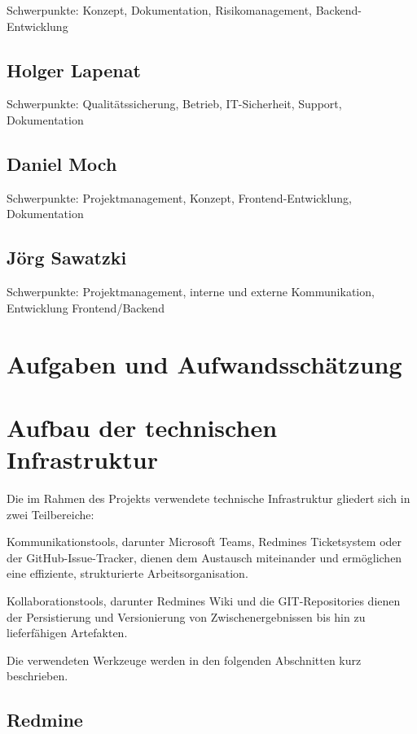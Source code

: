 \documentclass[a4paper,11pt,listof=numbered,glossary=totoc,parskip=half]{scrreprt}
\begin{document}
Schwerpunkte: Konzept, Dokumentation, Risikomanagement, Backend-Entwicklung

\subsection{Holger Lapenat}

Schwerpunkte: Qualitätssicherung, Betrieb, IT-Sicherheit, Support, Dokumentation

\subsection{Daniel Moch}

Schwerpunkte: Projektmanagement, Konzept, Frontend-Entwicklung, Dokumentation

\subsection{Jörg Sawatzki}

Schwerpunkte: Projektmanagement, interne und externe Kommunikation, Entwicklung Frontend/Backend


	
	\newpage
	\section{Aufgaben und Aufwandsschätzung}
	
	\newpage
	\section{Aufbau der technischen Infrastruktur}

Die im Rahmen des Projekts verwendete technische Infrastruktur gliedert sich in zwei Teilbereiche:

Kommunikationstools, darunter Microsoft Teams, Redmines Ticketsystem oder der GitHub-Issue-Tracker, dienen dem Austausch miteinander und ermöglichen eine effiziente, strukturierte Arbeitsorganisation.

Kollaborationstools, darunter Redmines Wiki und die GIT-Repositories dienen der Persistierung und Versionierung von Zwischenergebnissen bis hin zu lieferfähigen Artefakten.

Die verwendeten Werkzeuge werden in den folgenden Abschnitten kurz beschrieben.

\subsection{Redmine}
\end{document}
